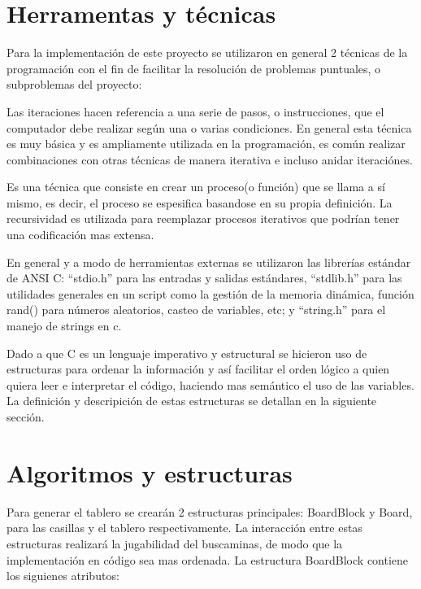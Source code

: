 \documentclass[letterpaper,12pt]{report}
\begin{document}
\section {Herramentas y técnicas}

Para la implementación de este proyecto se utilizaron en general 2 técnicas de la programación con el fin de facilitar la resolución de problemas puntuales, o subproblemas del proyecto:

\begin{description}[align=left]

\item [Iteración:]
    Las iteraciones hacen referencia a una serie de pasos, o instrucciones, que el computador debe realizar según una o varias condiciones. En general esta técnica es muy básica y es ampliamente utilizada en la programación, es común realizar combinaciones con otras técnicas de manera iterativa e incluso anidar iteraciónes.

\item [Recursividad:] 
    Es una técnica que consiste en crear un proceso(o función) que se llama a sí mismo, es decir, el proceso se espesifica basandose en su propia definición. La recursividad es utilizada para reemplazar procesos iterativos que podrían tener una codificación mas extensa.

\end{description} 

En general y a modo de herramientas externas se utilizaron las librerías estándar de ANSI C: ``stdio.h'' para las entradas y salidas estándares, ``stdlib.h'' para las utilidades generales en un script como la gestión de la memoria dinámica, función rand() para números aleatorios, casteo de variables, etc; y ``string.h'' para el manejo de strings en c.

Dado a que C es un lenguaje imperativo y estructural se hicieron uso de estructuras para ordenar la información y así facilitar el orden lógico a quien quiera leer e interpretar el código, haciendo mas semántico el uso de las variables. La definición y descripición de  estas estructuras se detallan en la siguiente sección.

\section {Algoritmos y estructuras}

Para generar el tablero se crearán 2 estructuras principales: BoardBlock y Board, para las casillas y el tablero respectivamente. La interacción entre estas estructuras realizará la jugabilidad del buscaminas, de modo que la implementación en código sea mas ordenada. La estructura BoardBlock contiene los siguienes atributos:
\end{document}
